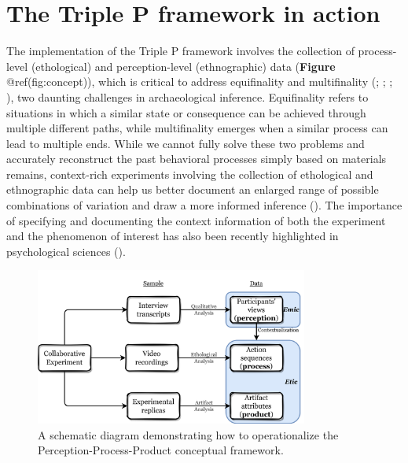 \documentclass[
  11pt,
  letterpaper,
  DIV=11,
  numbers=noendperiod]{scrartcl}
\begin{document}
\section{The Triple P framework in
action}\label{the-triple-p-framework-in-action}

The implementation of the Triple P framework involves the collection of
process-level (ethological) and perception-level (ethnographic) data
(\textbf{Figure} @ref(fig:concept)), which is critical to address
equifinality and multifinality
(;
; ; ), two daunting challenges in archaeological inference.
Equifinality refers to situations in which a similar state or
consequence can be achieved through multiple different paths, while
multifinality emerges when a similar process can lead to multiple ends.
While we cannot fully solve these two problems and accurately
reconstruct the past behavioral processes simply based on materials
remains, context-rich experiments involving the collection of
ethological and ethnographic data can help us better document an
enlarged range of possible combinations of variation and draw a more
informed inference (). The
importance of specifying and documenting the context information of both
the experiment and the phenomenon of interest has also been recently
highlighted in psychological sciences
().

\begin{figure}[H]

{\centering \includegraphics[width=0.8\textwidth,height=\textheight]{../figure/Fig1.jpg}

}

\caption{A schematic diagram demonstrating how to operationalize the
Perception-Process-Product conceptual framework.}

\end{figure}%
\end{document}
